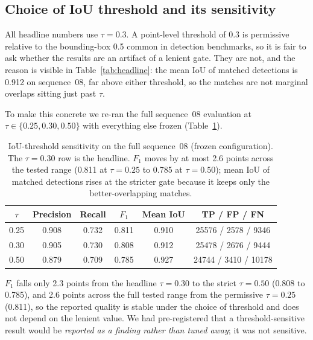 \subsection{Choice of IoU threshold and its sensitivity}
\label{sec:eval-iou-threshold}

All headline numbers use $\tau = 0.3$. A point-level threshold of 0.3 is
permissive relative to the bounding-box 0.5 common in detection benchmarks, so
it is fair to ask whether the results are an artifact of a lenient gate. They
are not, and the reason is visible in Table~\ref{tab:headline}: the mean IoU of
matched detections is \num{0.912} on sequence~08, far above either threshold, so
the matches are not marginal overlaps sitting just past $\tau$.

To make this concrete we re-ran the full sequence~08 evaluation at
$\tau \in \{0.25, 0.30, 0.50\}$ with everything else frozen
(Table~\ref{tab:iou-sensitivity}).

\begin{table}[H]
  \centering
  \caption{IoU-threshold sensitivity on the full sequence~08 (frozen
    configuration). The $\tau = 0.30$ row is the headline. $F_1$ moves by at most
    \num{2.6} points across the tested range (\num{0.811} at $\tau=0.25$ to
    \num{0.785} at $\tau=0.50$); mean IoU of matched detections rises at the
    stricter gate because it keeps only the better-overlapping matches.}
  \label{tab:iou-sensitivity}
  \begin{tabular}{cccccc}
    \toprule
    $\tau$ & Precision & Recall & $F_1$ & Mean IoU & TP / FP / FN \\
    \midrule
    0.25 & 0.908 & 0.732 & 0.811 & 0.910 & \num{25576} / \num{2578} / \num{9346} \\
    0.30 & 0.905 & 0.730 & 0.808 & 0.912 & \num{25478} / \num{2676} / \num{9444} \\
    0.50 & 0.879 & 0.709 & 0.785 & 0.927 & \num{24744} / \num{3410} / \num{10178} \\
    \bottomrule
  \end{tabular}
\end{table}

$F_1$ falls only \num{2.3} points from the headline $\tau = 0.30$ to the strict
$\tau = 0.50$ (\num{0.808} to \num{0.785}), and \num{2.6} points across the full
tested range from the permissive $\tau = 0.25$ (\num{0.811}), so the reported
quality is stable under the choice of threshold and does not depend on the lenient
value. We had
pre-registered that a threshold-sensitive result would be \emph{reported as a
finding rather than tuned away}; it was not sensitive.
